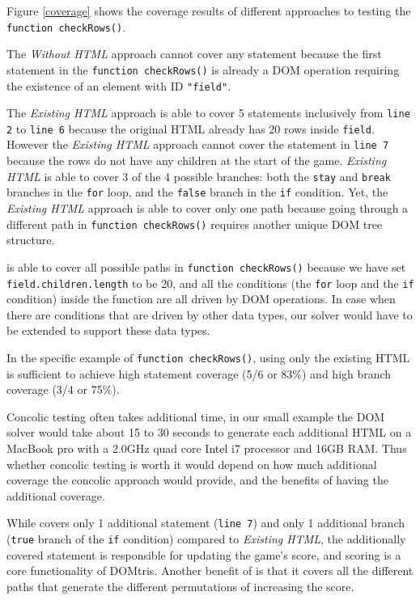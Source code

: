 Figure \ref{coverage} shows the coverage results of different approaches to testing the {\tt function checkRows()}.  

The {\em Without HTML} approach cannot cover any statement because the first statement in the {\tt function checkRows()} is already a DOM operation requiring the existence of an element with ID {\tt "field"}.

The {\em Existing HTML} approach is able to cover 5 statements inclusively from {\tt line 2} to {\tt line 6} because the original HTML already has 20 rows inside {\tt field}.  
However the {\em Existing HTML} approach cannot cover the statement in {\tt line 7} because the rows do not have any children at the start of the game. 
{\em Existing HTML} is able to cover 3 of the 4 possible branches: both the {\tt stay} and {\tt break} branches in the {\tt for} loop, and the {\tt false} branch in the {\tt if} condition. 
Yet, the {\em Existing HTML} approach is able to cover only one path because going through a different path in {\tt function checkRows()} requires another unique DOM tree structure.  

\tool is able to cover all possible paths in {\tt function checkRows()} because we have set {\tt field.children.length} to be 20, 
and all the conditions (the {\tt for} loop and the {\tt if} condition) inside the function are all driven by DOM operations.  
In case when there are conditions that are driven by other data types, our solver would have to be extended to support these data types.    

In the specific example of {\tt function checkRows()}, using only the existing HTML is sufficient to achieve high statement coverage (5/6 or 83\%) and high branch coverage (3/4 or 75\%).  

Concolic testing often takes additional time, in our small example the DOM solver would take about 15 to 30 seconds to generate each additional HTML on a MacBook pro with a 2.0GHz quad core Intel i7 processor and 16GB RAM.
Thus whether concolic testing is worth it would depend on how much additional coverage the concolic approach would provide, and the benefits of having the additional coverage.  

While \tool covers only 1 additional statement ({\tt line 7}) and only 1 additional branch ({\tt true} branch of the {\tt if} condition) compared to {\em Existing HTML}, 
the additionally covered statement is responsible for updating the game's score, and scoring is a core functionality of DOMtris.  
Another benefit of \tool is that it covers all the different paths that generate the different permutations of increasing the score.  

